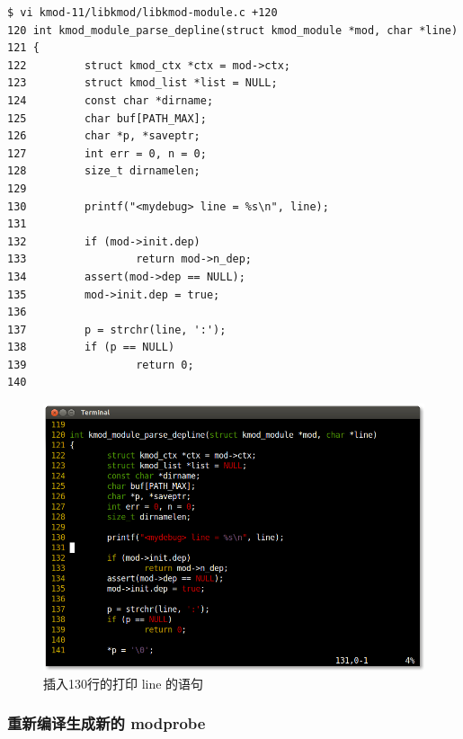 \documentclass[11pt,a4paper]{article}
\makeatletter
\def\maxwidth{\ifdim\Gin@nat@width>\linewidth\linewidth
\else\Gin@nat@width\fi}
\let\Oldincludegraphics\includegraphics
\renewcommand{\includegraphics}[1]{\Oldincludegraphics[width=\maxwidth]{#1}}
\makeatother
\begin{document}
{\begin{shaded}\begin{verbatim}
$ vi kmod-11/libkmod/libkmod-module.c +120
120 int kmod_module_parse_depline(struct kmod_module *mod, char *line)
121 {
122         struct kmod_ctx *ctx = mod->ctx;
123         struct kmod_list *list = NULL;
124         const char *dirname;
125         char buf[PATH_MAX];
126         char *p, *saveptr;
127         int err = 0, n = 0;
128         size_t dirnamelen;
129 
130         printf("<mydebug> line = %s\n", line);
131 
132         if (mod->init.dep)
133                 return mod->n_dep;
134         assert(mod->dep == NULL);
135         mod->init.dep = true;
136 
137         p = strchr(line, ':');
138         if (p == NULL)
139                 return 0;
140 
\end{verbatim}\end{shaded}}
\begin{figure}[htbp]
\centering
\includegraphics{./pictures/3-1-depline.png}
\caption{插入130行的打印 line 的语句}
\end{figure}

\subsubsection{重新编译生成新的 modprobe}
\end{document}
